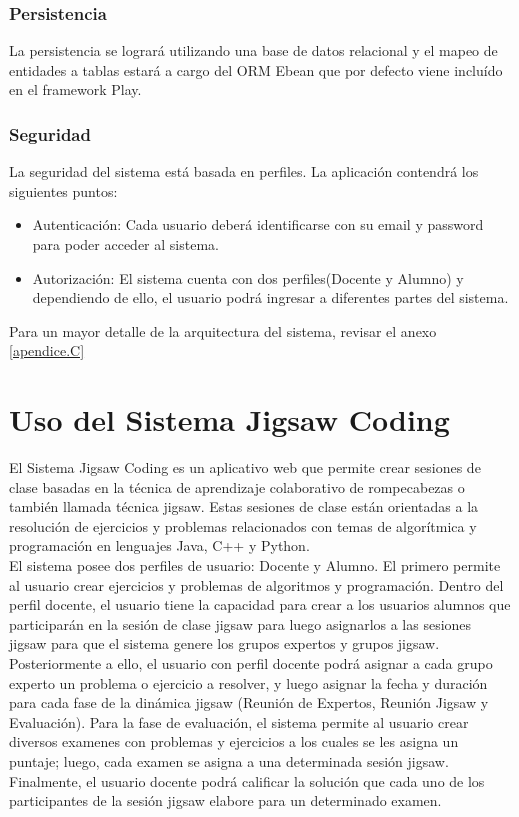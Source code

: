 \subsubsection{Persistencia}
La persistencia se logrará utilizando una base de datos relacional y el mapeo de entidades a tablas estará a cargo del ORM Ebean que por defecto viene incluído en el framework Play.

\subsubsection{Seguridad}
La seguridad del sistema está basada en perfiles. La aplicación contendrá los siguientes puntos:

\begin{itemize}
	\item Autenticación: Cada usuario deberá identificarse con su email y password para poder acceder al sistema.
	\item Autorización: El sistema cuenta con dos perfiles(Docente y Alumno) y dependiendo de ello, el usuario podrá ingresar a diferentes partes del sistema.
	\end{itemize}

Para un mayor detalle de la arquitectura del sistema, revisar el anexo \ref{apendice.C}

\section{Uso del Sistema Jigsaw Coding} 
El Sistema Jigsaw Coding es un aplicativo web que permite crear sesiones de clase basadas en la técnica de aprendizaje colaborativo de rompecabezas o también llamada técnica jigsaw. Estas sesiones de clase están orientadas a la resolución de ejercicios y problemas relacionados con temas de algorítmica y programación en lenguajes Java, C++ y Python.\\

El sistema posee dos perfiles de usuario: Docente y Alumno. El primero permite al usuario crear ejercicios y problemas de algoritmos y programación. Dentro del perfil docente, el usuario tiene la capacidad para crear a los usuarios alumnos que participarán en la sesión de clase jigsaw para luego asignarlos a las sesiones jigsaw para que el sistema genere los grupos expertos y grupos jigsaw. Posteriormente a ello, el usuario con perfil docente podrá asignar a cada grupo experto un problema o ejercicio a resolver, y luego asignar la fecha y duración para cada fase de la dinámica jigsaw (Reunión de Expertos, Reunión Jigsaw y Evaluación). Para la fase de evaluación, el sistema permite al usuario crear diversos examenes con problemas y ejercicios a los cuales se les asigna un puntaje; luego, cada examen se asigna a una determinada sesión jigsaw. Finalmente, el usuario docente podrá calificar la solución que cada uno de los participantes de la sesión jigsaw elabore para un determinado examen.\\

